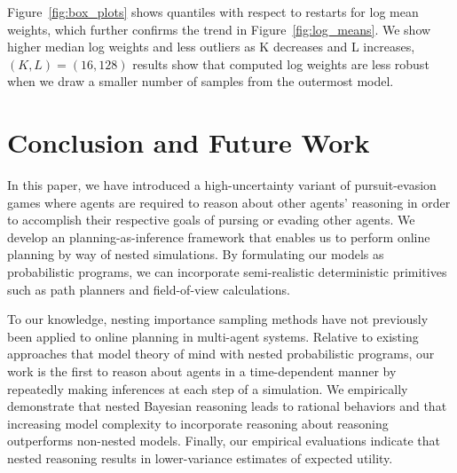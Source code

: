 \documentclass{article}
\begin{document}
Figure~\ref{fig:box_plots} shows quantiles with respect to restarts for log mean weights, which further confirms the trend in Figure~\ref{fig:log_means}. We show higher median log weights and less outliers as K decreases and L increases,  $(K,L)=(16,128)$ results show that computed log weights are less robust when we draw a smaller number of samples from the outermost model. 

\vskip -0.1in
\section{Conclusion and Future Work}


In this paper, we have introduced a high-uncertainty variant of pursuit-evasion games where agents are required to reason about other agents' reasoning in order to accomplish their respective goals of pursing or evading other agents. 
%
We develop an planning-as-inference framework that enables us to perform online planning by way of nested simulations.
%
By formulating our models as probabilistic programs, we can incorporate semi-realistic deterministic primitives such as path planners and field-of-view calculations. %
%

To our knowledge, nesting importance sampling methods have not previously been applied to online planning in  multi-agent systems. Relative to existing approaches that model theory of mind with nested probabilistic programs, our work is the first to reason about agents in a time-dependent manner by repeatedly making inferences at each step of a simulation.
%
We empirically demonstrate that nested Bayesian reasoning leads to rational behaviors and that increasing model complexity to incorporate reasoning about reasoning outperforms non-nested models. 
% 
Finally, our empirical evaluations indicate that nested reasoning results in lower-variance estimates of expected utility. 


\end{document}
